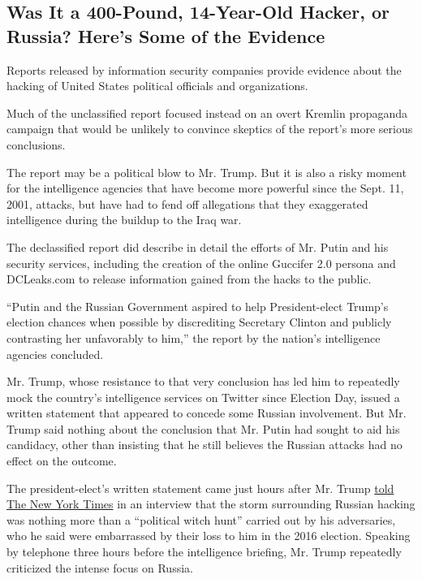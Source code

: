 \hypertarget{was-it-a-400-pound-14-year-old-hacker-or-russia-heres-some-of-the-evidence}{%
\subsection{Was It a 400-Pound, 14-Year-Old Hacker, or Russia? Here's
Some of the
Evidence}\label{was-it-a-400-pound-14-year-old-hacker-or-russia-heres-some-of-the-evidence}}

Reports released by information security companies provide evidence
about the hacking of United States political officials and
organizations.

Much of the unclassified report focused instead on an overt Kremlin
propaganda campaign that would be unlikely to convince skeptics of the
report's more serious conclusions.

The report may be a political blow to Mr. Trump. But it is also a risky
moment for the intelligence agencies that have become more powerful
since the Sept. 11, 2001, attacks, but have had to fend off allegations
that they exaggerated intelligence during the buildup to the Iraq war.

The declassified report did describe in detail the efforts of Mr. Putin
and his security services, including the creation of the online Guccifer
2.0 persona and DCLeaks.com to release information gained from the hacks
to the public.

``Putin and the Russian Government aspired to help President-elect
Trump's election chances when possible by discrediting Secretary Clinton
and publicly contrasting her unfavorably to him,'' the report by the
nation's intelligence agencies concluded.

Mr. Trump, whose resistance to that very conclusion has led him to
repeatedly mock the country's intelligence services on Twitter since
Election Day, issued a written statement that appeared to concede some
Russian involvement. But Mr. Trump said nothing about the conclusion
that Mr. Putin had sought to aid his candidacy, other than insisting
that he still believes the Russian attacks had no effect on the outcome.

The president-elect's written statement came just hours after Mr. Trump
\href{https://www.nytimes.com/2017/01/06/us/politics/donald-trump-wall-hack-russia.html}{told
The New York Times} in an interview that the storm surrounding Russian
hacking was nothing more than a ``political witch hunt'' carried out by
his adversaries, who he said were embarrassed by their loss to him in
the 2016 election. Speaking by telephone three hours before the
intelligence briefing, Mr. Trump repeatedly criticized the intense focus
on Russia.


